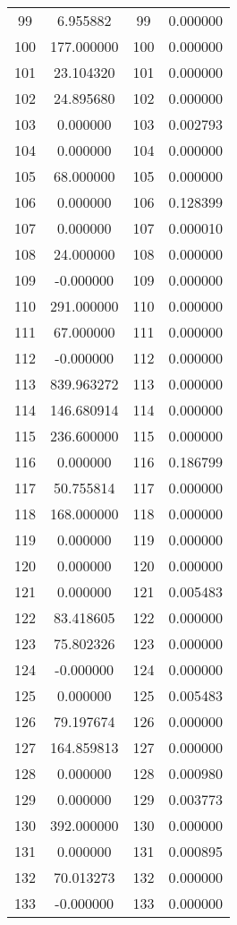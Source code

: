 \documentclass[12pt]{article}
\begin{document}
\begin{longtable}{@{}cccc@{}}
99 & 6.955882 & 99 & 0.000000 \\
100 & 177.000000 & 100 & 0.000000 \\
101 & 23.104320 & 101 & 0.000000 \\
102 & 24.895680 & 102 & 0.000000 \\
103 & 0.000000 & 103 & 0.002793 \\
104 & 0.000000 & 104 & 0.000000 \\
105 & 68.000000 & 105 & 0.000000 \\
106 & 0.000000 & 106 & 0.128399 \\
107 & 0.000000 & 107 & 0.000010 \\
108 & 24.000000 & 108 & 0.000000 \\
109 & -0.000000 & 109 & 0.000000 \\
110 & 291.000000 & 110 & 0.000000 \\
111 & 67.000000 & 111 & 0.000000 \\
112 & -0.000000 & 112 & 0.000000 \\
113 & 839.963272 & 113 & 0.000000 \\
114 & 146.680914 & 114 & 0.000000 \\
115 & 236.600000 & 115 & 0.000000 \\
116 & 0.000000 & 116 & 0.186799 \\
117 & 50.755814 & 117 & 0.000000 \\
118 & 168.000000 & 118 & 0.000000 \\
119 & 0.000000 & 119 & 0.000000 \\
120 & 0.000000 & 120 & 0.000000 \\
121 & 0.000000 & 121 & 0.005483 \\
122 & 83.418605 & 122 & 0.000000 \\
123 & 75.802326 & 123 & 0.000000 \\
124 & -0.000000 & 124 & 0.000000 \\
125 & 0.000000 & 125 & 0.005483 \\
126 & 79.197674 & 126 & 0.000000 \\
127 & 164.859813 & 127 & 0.000000 \\
128 & 0.000000 & 128 & 0.000980 \\
129 & 0.000000 & 129 & 0.003773 \\
130 & 392.000000 & 130 & 0.000000 \\
131 & 0.000000 & 131 & 0.000895 \\
132 & 70.013273 & 132 & 0.000000 \\
133 & -0.000000 & 133 & 0.000000 \\

\end{longtable}
\end{document}
